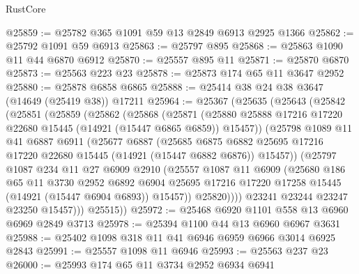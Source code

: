 \begin{lexlean}{RustCore}
\begin{coremodule}
@25859 := @25782 @365 @1091 @59 @13 @2849 @6913 @2925 @1366
@25862 := @25792 @1091 @59 @6913
@25863 := @25797 @895
@25868 := @25863 @1090 @11 @44 @6870 @6912
@25870 := @25557 @895 @11
@25871 := @25870 @6870
@25873 := @25563 @223 @23
@25878 := @25873 @174 @65 @11 @3647 @2952
@25880 := @25878 @6858 @6865
@25888 := @25414 @38 @24 @38 @3647 (@14649 (@25419 @38)) @17211
@25964 := @25367
    (@25635
      (@25643
        (@25842
          (@25851
            (@25859
              (@25862
                (@25868
                  (@25871
                    (@25880
                      @25888
                      @17216
                      @17220
                      @22680
                      @15445
                      (@14921 (@15447 @6865 @6859))
                      @15457))
                  (@25798
                    @1089
                    @11
                    @41
                    @6887
                    @6911
                    (@25677
                      @6887
                      (@25685
                        @6875
                        @6882
                        @25695
                        @17216
                        @17220
                        @22680
                        @15445
                        (@14921 (@15447 @6882 @6876))
                        @15457))
                    (@25797
                      @1087
                      @234
                      @11
                      @27
                      @6909
                      @2910
                      (@25557
                        @1087
                        @11
                        @6909
                        (@25680
                          @186
                          @65
                          @11
                          @3730
                          @2952
                          @6892
                          @6904
                          @25695
                          @17216
                          @17220
                          @17258
                          @15445
                          (@14921 (@15447 @6904 @6893))
                          @15457))
                      @25820))))
              @23241
              @23244
              @23247
              @23250
              @15457)))
        @25515))
@25972 := @25468 @6920 @1101 @558 @13 @6960 @6969 @2849 @3713
@25978 := @25394 @1100 @44 @13 @6960 @6967 @3631
@25988 := @25402 @1098 @318 @11 @41 @6946 @6959 @6966 @3014 @6925 @2843
@25991 := @25557 @1098 @11 @6946
@25993 := @25563 @237 @23
@26000 := @25993 @174 @65 @11 @3734 @2952 @6934 @6941

\end{coremodule}
\end{lexlean}
